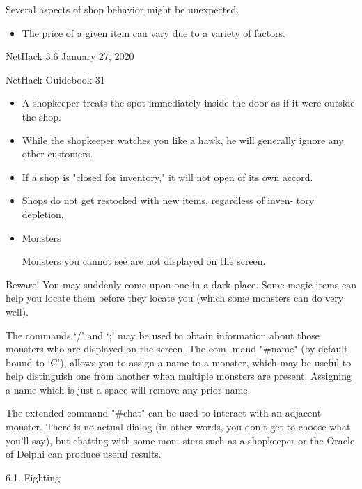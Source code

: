 \documentclass[11pt]{article}
\begin{document}
Several aspects of shop behavior might be unexpected.

\begin{itemize}
\item The price of a given item can vary due to a variety of factors.
\end{itemize}




NetHack 3.6                   January 27, 2020





NetHack Guidebook                       31



\begin{itemize}
\item A shopkeeper treats the spot immediately inside the door as if
it were outside the shop.

\item While the shopkeeper watches you like a hawk, he will generally
ignore any other customers.

\item If a shop is "closed for inventory," it will not open of its
own accord.

\item Shops do not get restocked with new items, regardless of inven-
tory depletion.

\item Monsters

Monsters you cannot see are not displayed on the screen.
\end{itemize}
Beware!  You may suddenly come upon one in a dark place. Some
magic items can help you locate them before they locate you
(which some monsters can do very well).

   The commands `/' and `;' may be used to obtain information
about those monsters who are displayed on the screen.  The com-
mand "\#name" (by default bound to `C'), allows you to assign a
name to a monster, which may be useful to help distinguish one
from another when multiple monsters are present. Assigning a
name which is just a space will remove any prior name.

   The extended command "\#chat" can be used to interact with an
adjacent monster. There is no actual dialog (in other words, you
don't get to choose what you'll say), but chatting with some mon-
sters such as a shopkeeper or the Oracle of Delphi can produce
useful results.

6.1. Fighting
\end{document}
